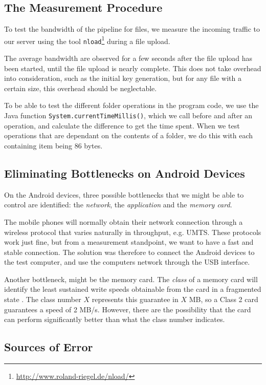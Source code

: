 \documentclass[pdftex,english,10pt,b5paper,twoside]{book}
\begin{document}
\subsection{The Measurement Procedure}

To test the bandwidth of the pipeline for files, we measure the incoming
traffic to our server using the tool \texttt{nload}\footnote{
\url{http://www.roland-riegel.de/nload/}} during a file upload.

The average bandwidth are observed for a few seconds after the file upload has
been started, until the file upload is nearly complete. This does not take
overhead into consideration, such as the initial key generation, but for any
file with a certain size, this overhead should be neglectable.

To be able to test the different folder operations in the program code, we use
the Java function \texttt{System.currentTimeMillis()}, which we call before and
after an operation, and calculate the difference to get the time spent. When we
test operations that are dependant on the contents of a folder, we do this with
each containing item being 86 bytes.

\subsection{Eliminating Bottlenecks on Android Devices}

On the Android devices, three possible bottlenecks that we might be able to
control are identified: the \emph{network}, the \emph{application} and the
\emph{memory card}.

The mobile phones will normally obtain their network connection through a
wireless protocol that varies naturally in throughput, e.g. \ac{UMTS}. These
protocols work just fine, but from a measurement standpoint, we want to have a
fast and stable connection. The solution was therefore to connect the Android
devices to the test computer, and use the computers network through the
\ac{USB} interface.

Another bottleneck, might be the memory card. The \emph{class} of a memory card
will identify the least sustained write speeds obtainable from the card in a
fragmented state \cite{sdcard}. The class number $X$ represents this guarantee
in $X$ MB, so a Class 2 card guarantees a speed of 2 MB/s. However, there are
the possibility that the card can perform significantly better than what the
class number indicates.

\subsection{Sources of Error}
\end{document}
